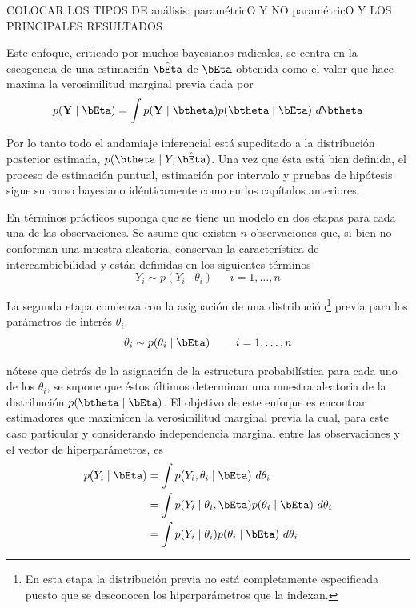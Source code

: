 \documentclass[10pt,openright]{book}\usepackage[]{graphicx}\usepackage[]{color}
\begin{document}
COLOCAR LOS TIPOS DE an\'alisis: param\'etricO Y NO param\'etricO Y LOS PRINCIPALES RESULTADOS

Este enfoque, criticado por muchos bayesianos radicales, se centra en la escogencia de una estimaci\'on $\hat{\bEta}$ de $\bEta$ obtenida como el valor que hace maxima la verosimilitud marginal previa dada por
\begin{align}\label{ecua1}
p(\mathbf{Y} \mid \bEta)=\int p(\mathbf{Y} \mid \btheta)p(\btheta \mid \bEta) \ d\btheta
\end{align}

Por lo tanto todo el andamiaje inferencial est\'a supeditado a la distribuci\'on posterior estimada, $p(\btheta \mid Y,\hat{\bEta})$. Una vez que \'esta est\'a bien definida, el proceso de estimaci\'on puntual, estimaci\'on por intervalo y pruebas de hip\'otesis sigue su curso bayesiano id\'enticamente como en los cap\'itulos anteriores.

En t\'erminos pr\'acticos suponga que se tiene un modelo en dos etapas para cada una de las observaciones. Se asume que existen $n$ observaciones que, si bien no conforman una muestra aleatoria, conservan la caracter\'istica de intercambiebilidad y est\'an definidas en los siguientes t\'erminos
\begin{equation*}
Y_i \sim p(Y_i \mid \theta_i) \ \ \ \ \ \ \ i=1,\ldots,n
\end{equation*}

La segunda etapa comienza con la asignaci\'on de una distribuci\'on\footnote{En esta etapa la distribuci\'on previa no est\'a completamente especificada puesto que se desconocen los hiperpar\'ametros que la indexan.} previa para los par\'ametros de inter\'es $\theta_i$.
\begin{equation*}
\theta_i \sim p(\theta_i \mid \bEta) \ \ \ \ \ \ \ i=1,\ldots,n
\end{equation*}

n\'otese que detr\'as de la asignaci\'on de la estructura probabil\'istica para cada uno de los $\theta_i$, se supone que \'estos \'ultimos determinan una muestra aleatoria de la distribuci\'on $p(\btheta \mid \bEta)$.
El objetivo de este enfoque es encontrar estimadores que maximicen la verosimilitud marginal previa la cual, para este caso particular y considerando independencia marginal entre las observaciones y el vector de hiperpar\'ametros, es
\begin{align}
p(Y_i \mid \bEta)&=\int p(Y_i,\theta_i \mid \bEta) \ d\theta_i \notag \\
&=\int p(Y_i \mid \theta_i,\bEta)p(\theta_i \mid \bEta) \ d\theta_i \notag \\
&=\int p(Y_i \mid \theta_i)p(\theta_i \mid \bEta) \ d\theta_i
\end{align}
\end{document}

